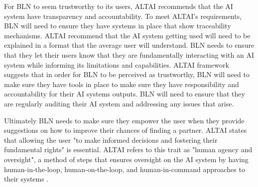 \documentclass[a4paper,10pt]{article}
\begin{document}
	For BLN to seem trustworthy to its users, ALTAI recommends that the AI system have transparency and accountability. To meet ALTAI's requirements, BLN will need to ensure they have systems in place that show traceability mechanisms. ALTAI recommend that the AI system getting used will need to be explained in a format that the average user will understand. BLN needs to ensure that they let their users know that they are fundamentally interacting with an AI system while informing its limitations and capabilities. ALTAI framework suggests that in order for BLN to be perceived as trustworthy, BLN will need to make sure they have tools in place to make sure they have responsibility and accountability for their AI systems outputs. BLN will need to ensure that they are regularly auditing their AI system and addressing any issues that arise.  
	
	Ultimately BLN needs to make sure they empower the user when they provide suggestions on how to improve their chances of finding a partner. ALTAI states that allowing the user "to make informed decisions and fostering their fundamental rights" \cite{ALTAI_ws} is essential. ALTAI refers to this trait as "human agency and oversight", a method of steps that ensures oversight on the AI system by having human-in-the-loop, human-on-the-loop, and human-in-command approaches to their systems \cite{ALTAI_ws}.
	
\medskip
\newpage
	
	

\newpage



\end{document}
